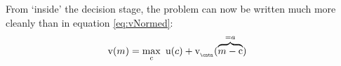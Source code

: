 \documentclass[titlepage, headings=optiontotocandhead]{econtex}
\begin{document}
From `inside' the decision stage, the {\Decision} problem can now be written much more cleanly than in equation \eqref{eq:vNormed}:
  \begin{equation}\begin{gathered}\begin{aligned}
        \mathrm{v}(m) & = \max_{c}~ \mathrm{u}(c) + \mathrm{v}_{_\cntn}(\overbrace{m-\mathrm{c}}^{=a}) \label{eq:vMidStgCNrm}
      \end{aligned}\end{gathered}\end{equation}

\end{document}
